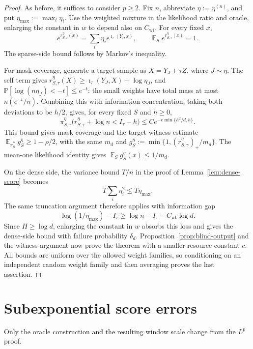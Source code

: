 \documentclass[11pt,letterpaper]{article}
\DeclareMathOperator*{\E}{\mathbb{E}}
\newcommand{\1}{\mathbbm{1}}
\newcommand{\Prob}{\mathbb P}
\begin{document}
\begin{proof}
As before, it suffices to consider \(p\ge2\).
Fix \(n\), abbreviate \(\eta:=\eta^{(n)}\), and put
\(\eta_{\max}:=\max_i\eta_i\).
Use the weighted mixture in the likelihood ratio and oracle, enlarging
the constant in \(w\) to depend also on \(C_{\mathrm{wt}}\).
For every fixed \(x\),
\[
   e^{r^\eta_{S,\tau}(x)}
   =\sum_i\eta_i e^{\imath_\tau(Y_i,x)},
   \qquad \E_S e^{r^\eta_{S,\tau}(x)}=1.
\]
The sparse-side bound follows by Markov's inequality.

For mask coverage, generate a target sample as \(X=Y_J+\tau Z\),
where \(J\sim\eta\).  The self term gives
\(r^\eta_{S,\tau}(X)\ge\imath_\tau(Y_J,X)+\log\eta_J\), and
\(\Prob[\log(n\eta_J)<-t]\le e^{-t}\): the small weights have
total mass at most \(n(e^{-t}/n)\).
Combining this with information concentration, taking both deviations
to be \(h/2\), gives, for every fixed \(S\) and \(h\ge0\),
\[
   \pi^\eta_{S,\tau}
   \bigl(r^\eta_{S,\tau}+\log n<I_\tau-h\bigr)
   \le C e^{-c\min\{h^2/d,h\}}.
\]
This bound gives mask coverage and the target witness estimate
\(\E_{\pi^\eta_S}g^\eta_S\ge1-\rho/2\), with the same \(m_d\)
and \(g^\eta_S:=\min\{1,(r^\eta_{S,\gamma})_+/m_d\}\).
The mean-one likelihood identity gives \(\E_Sg^\eta_S(x)\le1/m_d\).

On the dense side, the variance bound \(T/n\) in the proof of
Lemma~\ref{lem:dense-score} becomes
\[
   T\sum_i\eta_i^2\le T\eta_{\max}.
\]
The same truncation argument therefore applies with information gap
\[
   \log(1/\eta_{\max})-I_\tau
   \ge\log n-I_\tau-C_{\mathrm{wt}}\log d.
\]
Since \(H\ge\log d\), enlarging the constant in \(w\) absorbs this
loss and gives the dense-side bound with failure probability
\(\delta_d\).  Proposition~\ref{prop:blind-output} and the witness
argument now prove the theorem with a smaller resource constant \(c\).
All bounds are uniform over the allowed weight families, so conditioning
on an independent random weight family and then averaging proves the
last assertion.
\end{proof}

\section{Subexponential score errors}
\label{sec:subexponential}

Only the oracle construction and the resulting window scale change
from the \(L^p\) proof.
\end{document}
